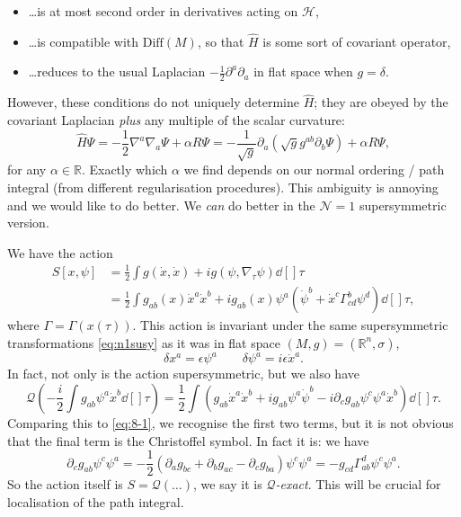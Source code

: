 \begin{itemize}
  \item \dots is at most second order in derivatives acting on $\mathscr{H}$,
  \item \dots is compatible with $\text{Diff}(M)$, so that $\hat{H}$ is some sort of covariant operator,
  \item \dots reduces to the usual Laplacian $-\frac{1}{2} \partial^{a} \partial_{a}$ in flat space when $g = \delta$.
\end{itemize}
However, these conditions do not uniquely determine $\hat{H}$; they are obeyed by the covariant Laplacian \emph{plus} any multiple of the scalar curvature: 
\begin{equation}
  \label{eq:9-r}
  \hat{H} \Psi = - \frac{1}{2} \nabla^a \nabla_a \Psi + \alpha R \Psi = -\frac{1}{\sqrt{g}} \partial_{a} (\sqrt{g} g^{ab} \partial_b \Psi) + \alpha R \Psi,
\end{equation}
for any $\alpha \in \mathbb{R}$.
Exactly which $\alpha$ we find depends on our normal ordering / path integral (from different regularisation procedures).
This ambiguity is annoying and we would like to do better. We \emph{can} do better in the $\mathcal{N} = 1$ supersymmetric version.

We have the action
\begin{align}
  S[x, \psi] &= \frac{1}{2} \int g(\dot{x}, \dot{x})  + i g (\psi, \nabla_\tau \psi) \dd[]{\tau} \\
	     &= \frac{1}{2} \int g_{ab}(x) \dot{x}^a \dot{x}^{b} + i g_{ab} (x) \psi^{a} \left( \dot{\psi}^{b} + \dot{x}^{c} \Gamma^{b}_{cd} \psi^{d} \right) \dd[]{\tau}, \label{eq:8-1}
\end{align}
where $\Gamma = \Gamma(x(\tau))$.
This action is invariant under the same supersymmetric transformations \eqref{eq:n1susy} as it was in flat space $(M, g) = (\mathbb{R}^n, \sigma)$, 
\begin{equation}
  \delta x^{a} =  \epsilon \psi^{a} \qquad \delta \psi^{a} = i \epsilon \dot{x}^{a}.
\end{equation}
In fact, not only is the action supersymmetric, but we also have
\begin{equation}
  \mathcal{Q} \left( -\frac{i}{2} \int g_{ab} \psi^{a} \dot{x}^{b} \dd[]{\tau} \right)  =\frac{1}{2} \int \left( g_{ab} \dot{x}^{a} \dot{x}^{b} + i g_{ab} \psi^{a} \dot{\psi}^{b} - i \partial_{c} g_{ab} \psi^{c} \psi^{a} \dot{x} ^{b} \right) \dd[]{\tau}.
\end{equation}
Comparing this to \eqref{eq:8-1}, we recognise the first two terms, but it is not obvious that the final term is the Christoffel symbol.
In fact it is:
we have
\begin{equation}
  \partial_{c} g_{ab} \psi^{c} \psi^{a} = -\frac{1}{2} \left( \partial_{a} g_{bc} + \partial_{b} g_{ac} - \partial_{c} g_{ba} \right) \psi^{c} \psi^{a} = -g_{cd} \Gamma^{d}_{ab} \psi^{c} \psi^{a}.
\end{equation}
So the action itself is $S = \mathcal{Q} (\dots)$, we say it is  \emph{$\mathcal{Q}$-exact}.
This will be crucial for localisation of the path integral.

